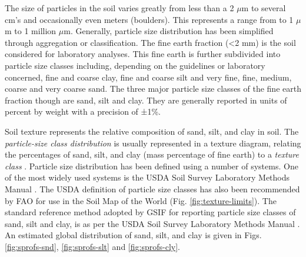 \documentclass[graybox,natbib,nospthms,UStrade]{svmono}
\begin{document}
The size of particles in the soil varies greatly from less than a 2 \(\mu\)m to
several cm's and occasionally even meters (boulders). This represents a
range from to 1 \(\mu\)m to 1 million \(\mu\)m. Generally, particle size distribution has been
simplified through aggregation or classification. The fine earth
fraction (\textless{}2 mm) is the soil considered for laboratory analyses. This fine
earth is further subdivided into particle size classes including,
depending on the guidelines or laboratory concerned, fine and coarse
clay, fine and coarse silt and very fine, fine, medium, coarse and very
coarse sand. The three major particle size classes of the fine earth
fraction though are sand, silt and clay. They are generally reported in
units of percent by weight with a precision of ±1\%.

Soil texture represents the relative composition of sand, silt, and clay
in soil. The \emph{particle-size class distribution} is usually represented
in a texture diagram, relating the percentages of sand, silt, and clay
(mass percentage of fine earth) to a \emph{texture class} \citep{Minasny2001AJSR}.
Particle size distribution has been defined using a number of systems.
One of the most widely used systems is the USDA Soil Survey Laboratory
Methods Manual \citep{Burt2004SSIR}. The USDA definition of particle size
classes has also been recommended by FAO for use in the Soil Map of the
World (Fig. \ref{fig:texture-limits}). The standard reference method adopted by
GSIF for reporting particle size classes of sand, silt and clay, is as
per the USDA Soil Survey Laboratory Methods Manual \citep[ p.347]{Burt2004SSIR}. An estimated global distribution of sand, silt, and clay is
given in Figs. \ref{fig:sprofs-snd}, \ref{fig:sprofs-slt} and
\ref{fig:sprofs-cly}.
\end{document}
